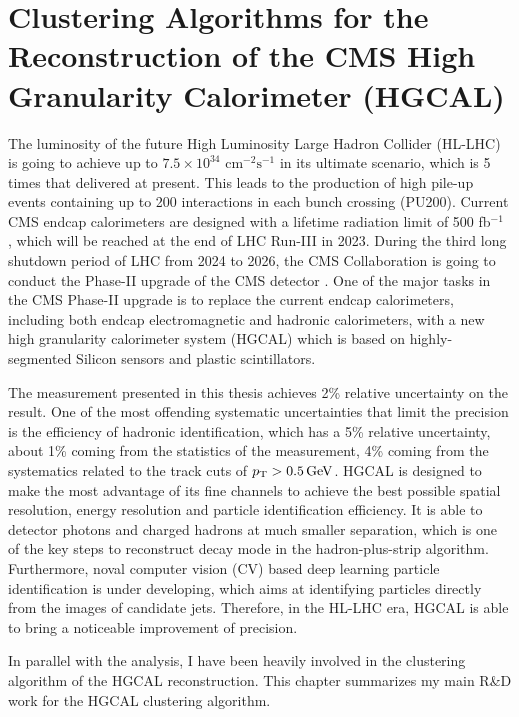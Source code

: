 \chapter{Clustering Algorithms for the Reconstruction of the CMS High Granularity Calorimeter (HGCAL)}
\label{sec:hgcal}


The luminosity of the future High Luminosity Large Hadron Collider (HL-LHC) is going to achieve up to $7.5\times 10^{34}$ $\text{cm}^{-2}\text{s}^{-1}$ \cite{hllhcweb} in its ultimate scenario, which is 5 times that delivered at present. This leads to the production of high pile-up events containing up to 200 interactions in each bunch crossing (PU200). Current CMS endcap calorimeters \cite{Chatrchyan:2008aa} are designed with a lifetime radiation limit of 500 fb$^{-1}$ \cite{CMSCollaboration:2015zni}, which will be reached at the end of LHC Run-III in 2023. During the third long shutdown period of LHC from 2024 to 2026, the CMS Collaboration is going to conduct the Phase-II upgrade of the CMS detector \cite{CMSCollaboration:2015zni}. One of the major tasks in the CMS Phase-II upgrade is to replace the current endcap calorimeters, including both endcap electromagnetic and hadronic calorimeters, with a new high granularity calorimeter system (HGCAL) which is based on highly-segmented Silicon sensors and plastic scintillators.


The \BWl measurement presented in this thesis achieves 2\% relative uncertainty on the \BWt result. One of the most offending systematic uncertainties that limit the precision is the efficiency of hadronic identification, which has a 5\% relative uncertainty, about 1\% coming from the statistics of the measurement, 4\% coming from the systematics related to the track cuts of $p_{\mathrm{T}}>0.5\,\text{Ge\hspace{-.08em}V}$. HGCAL is designed to make the most advantage of its fine channels to achieve the best possible spatial resolution, energy resolution and particle identification efficiency. It is able to detector photons and charged hadrons at much smaller separation, which is one of the key steps to reconstruct \PGth decay mode in the hadron-plus-strip algorithm. Furthermore, noval computer vision (CV) based deep learning particle identification is under developing, which aims at identifying particles directly from the images of candidate jets. Therefore, in the HL-LHC era, HGCAL is able to bring a noticeable improvement of \BWl precision.

In parallel with the \BWl analysis, I have been heavily involved in the clustering algorithm of the HGCAL reconstruction. This chapter summarizes my main R\&D work for the HGCAL clustering algorithm.







% 



